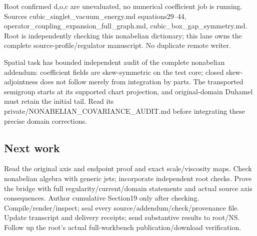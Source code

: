 Root confirmed d,o,c are unevaluated, no numerical coefficient job is
running. Sources cubic\_singlet\_vacuum\_energy.md equations29--44,
operator\_coupling\_expansion\_full\_graph.md,
cubic\_box\_gap\_symmetry.md. Root is independently checking this
nonabelian dictionary; this lane owns the complete
source-profile/regulator manuscript. No duplicate remote writer.

Spatial task has bounded independent audit of the complete nonabelian
addendum: coefficient fields are skew-symmetric on the test core; closed
skew-adjointness does not follow merely from integration by parts. The
transported semigroup starts at its supported chart projection, and
original-domain Duhamel must retain the initial tail. Read its
private/NONABELIAN\_COVARIANCE\_AUDIT.md before integrating these
precise domain corrections.

\subsection{Next work}\label{nonabelian-flow-continuity-md-next-work}

Read the original axis and endpoint proof and exact scale/viscosity
maps. Check nonabelian algebra with generic jets; incorporate
independent root checks. Prove the bridge with full
regularity/current/domain statements and actual source axis
consequences. Author cumulative Section19 only after checking.
Compile/render/inspect; seal every source/addendum/check/provenance
file. Update transcript and delivery receipts; send substantive results
to root/NS. Follow up the root's actual full-workbench
publication/download verification.
